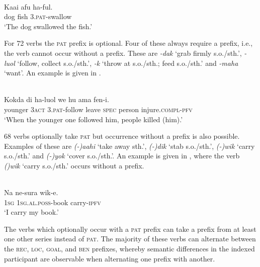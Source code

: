\ea%
\label{bkm:Ref323745334}
 \\ 
\gll     Kaai   afu  ha-ful.\\  
    dog  fish  3.\textsc{pat}{}-swallow  \\
\glt  `The dog swallowed the fish.'
\z







For 72 verbs the \textsc{pat} prefix is optional. Four of these always require a prefix, i.e., the verb cannot occur without a prefix. These are \textit{{}-dak} `grab firmly s.o./sth.', \textit{{}-luol} `follow, collect s.o./sth.', \textit{{}-k} `throw at s.o./sth.; feed s.o./sth.' and \textit{{}-maha} `want'. An example is given in .


\ea%
\label{bkm:Ref383697342}
 \\ 
\gll    Kokda   di  ha-luol  we  hu  ama  fen-i. \\  
   younger  3\textsc{act} 3.\textsc{pat}{}-follow  leave  \textsc{spec} person  injure.\textsc{compl}{}-\textsc{pfv}  \\
\glt  `When the younger one followed him, people killed (him).'
\z



 



68 verbs optionally take \textsc{pat} but occurrence without a prefix is also possible. Examples of these are \textit{(-)}\textit{aahi} `take away sth.', \textit{(-)}\textit{dik} `stab s.o./sth.', \textit{(-)}\textit{wik} `carry s.o./sth.' and \textit{(-)}\textit{yok} `cover s.o./sth.'. An example is given in , where the verb \textit{()wik} `carry s.o./sth.' occurs without a prefix.


\ea%
\label{bkm:Ref383697351}
 \\ 
\gll     Na   ne-sura  wik-e.\\  
     1\textsc{sg} \textsc{1sg.al.poss}{}-book  carry-\textsc{ipfv} \\
\glt  `I carry my book.'
\z







The verbs which optionally occur with a \textsc{pat} prefix can take a prefix from at least one other series instead of \textsc{pat}. The majority of these verbs can alternate  between the \textsc{rec}, \textsc{loc}, \textsc{goal}, and \textsc{ben} prefixes, whereby semantic differences in the indexed participant are observable when alternating one prefix with another.

